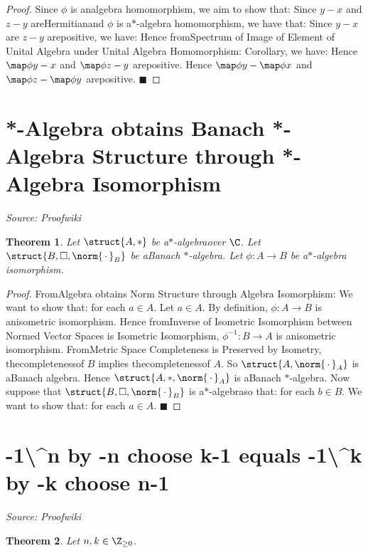 \documentclass{article}
\newtheorem{theorem}{Theorem}
\begin{document}
\begin{proof}
Since $\phi$ is analgebra homomorphism, we aim to show that: Since $y - x$ and $z - y$ areHermitianand $\phi$ is a$\ast$-algebra homomorphism, we have that: Since $y - x$ are $z - y$ arepositive, we have: Hence fromSpectrum of Image of Element of Unital Algebra under Unital Algebra Homomorphism: Corollary, we have: Hence $\map \phi {y - x}$ and $\map \phi {z - y}$ arepositive. Hence $\map \phi y - \map \phi x$ and $\map \phi z - \map \phi y$ arepositive. $\blacksquare$
\end{proof}

\newpage

\section{*-Algebra obtains Banach *-Algebra Structure through *-Algebra Isomorphism}
\textit{Source: Proofwiki}

\begin{theorem}
Let $\struct {A, \ast}$ be a$\ast$-algebraover $\C$. Let $\struct {B, \square, \norm {\, \cdot \,}_B}$ be aBanach $\ast$-algebra. Let $\phi : A \to B$ be a$\ast$-algebra isomorphism.
\end{theorem}

\begin{proof}
FromAlgebra obtains Norm Structure through Algebra Isomorphism: We want to show that: for each $a \in A$. Let $a \in A$. By definition, $\phi : A \to B$ is anisometric isomorphism. Hence fromInverse of Isometric Isomorphism between Normed Vector Spaces is Isometric Isomorphism, $\phi^{-1} : B \to A$ is anisometric isomorphism. FromMetric Space Completeness is Preserved by Isometry, thecompletenessof $B$ implies thecompletenessof $A$. So $\struct {A, \norm {\, \cdot \,}_A}$ is aBanach algebra. Hence $\struct {A, \ast, \norm {\, \cdot \,}_A}$ is aBanach $\ast$-algebra. Now suppose that $\struct {B, \square, \norm {\, \cdot \,}_B}$ is a$\ast$-algebraso that: for each $b \in B$. We want to show that: for each $a \in A$. $\blacksquare$
\end{proof}

\newpage

\section{-1\textbackslash{}^{}n by -n choose k-1 equals -1\textbackslash{}^{}k by -k choose n-1}
\textit{Source: Proofwiki}

\begin{theorem}
Let $n, k \in \Z_{\ge 0}$.
\end{theorem}
\end{document}

